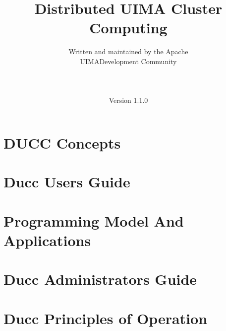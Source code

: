 \documentclass[oneside]{book}
\title{\Huge \textbf{Distributed UIMA Cluster Computing}}
\author{Written and maintained by the Apache\\
UIMA\texttrademark Development Community \\
\\
\\
\\
Version 1.1.0}
\date{}
\begin{document}
\frontmatter
\maketitle



\renewcommand\contentsname{Table of Contents}
\tableofcontents
\listoffigures

\mainmatter



\part{DUCC Concepts}



\part{Ducc Users Guide}


\part{Programming Model And Applications}


\part{Ducc Administrators Guide}


\part{Ducc Principles of Operation}

\end{document}
